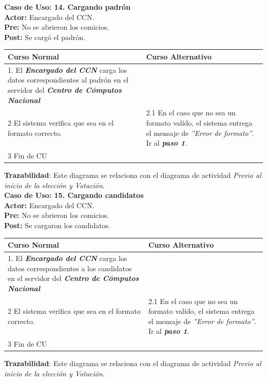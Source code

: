 \documentclass[spanish, 10pt,a4paper]{article}
\numberwithin{equation}{section} %
\begin{document}
\noindent\textbf{Caso de Uso: 14. Cargando padrón}\\
\textbf{Actor: } Encargado del CCN.\\
\textbf{Pre: } No se abrieron los comicios.\\
\textbf{Post: } Se cargó el padrón.\\
\begin{table}[H]
  \centering
\bgroup
\def\arraystretch{1.3}
  \begin{tabular}{p{9cm} | p{7cm}}
    \hline
    Curso Normal & Curso Alternativo \\
    \hline
    \hline    
    1. El \textbf{\textit{Encargado del CCN}} carga los datos correspondientes al padrón en el servidor del \textbf{\textit{Centro de Cómputos Nacional}}
    & \\
    
    \hline
    2 El sistema verifica que sea en el formato correcto.
    & 
    2.1 En el caso que no sea un formato valído, el sistema entrega el mensaje de \textit{''Error de formato''}. Ir al \textbf{\textit{paso 1}}.
    \\
       
    \hline
    3 Fin de CU
    & \\
    \hline
  \end{tabular}
\egroup
\end{table}
\vspace{-10px}
\noindent\textbf{Trazabilidad}: Este diagrama se relaciona con el diagrama de actividad \textit{Previo al inicio de la elección y Votación}.\\


\clearpage
\noindent\textbf{Caso de Uso: 15. Cargando candidatos}\\
\textbf{Actor: } Encargado del CCN.\\
\textbf{Pre: } No se abrieron los comicios.\\
\textbf{Post: } Se cargaron los candidatos.\\
\begin{table}[H]
  \centering
\bgroup
\def\arraystretch{1.3}
  \begin{tabular}{p{9cm} | p{7cm}}
    \hline
    Curso Normal & Curso Alternativo \\
    \hline
    \hline    
    1. El \textbf{\textit{Encargado del CCN}} carga los datos correspondientes a los candidatos en el servidor del \textbf{\textit{Centro de Cómputos Nacional}}
    & \\
    
    \hline
    2 El sistema verifica que sea en el formato correcto.
    & 
    2.1 En el caso que no sea un formato valído, el sistema entrega el mensaje de \textit{''Error de formato''}. Ir al \textbf{\textit{paso 1}}.
    \\
       
    \hline
    3 Fin de CU
    & \\
    \hline
  \end{tabular}
\egroup
\end{table}
\vspace{-10px}
\noindent\textbf{Trazabilidad}: Este diagrama se relaciona con el diagrama de actividad \textit{Previo al inicio de la elección y Votación}.\\
\end{document}
